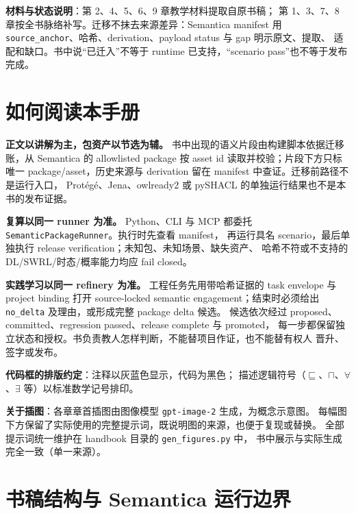 \documentclass[a4paper]{ctexbook}
\begin{document}
\begin{noteblock}
\textbf{材料与状态说明}：第 2、4、5、6、9 章教学材料提取自原书稿；
第 1、3、7、8 章按全书脉络补写。迁移不抹去来源差异：Semantica manifest 用
\texttt{source\_anchor}、哈希、derivation、payload status 与 gap 明示原文、提取、
适配和缺口。书中说“已迁入”不等于 runtime 已支持，“scenario pass”也不等于发布完成。
\end{noteblock}

\section*{如何阅读本手册}

\textbf{正文以讲解为主，包资产以节选为辅。}
书中出现的语义片段由构建脚本依据迁移账，从 Semantica 的 allowlisted package
按 asset id 读取并校验；片段下方只标唯一 package/asset，历史来源与 derivation
留在 manifest 中查证。迁移前路径不是运行入口，
Protégé、Jena、owlready2 或 pySHACL 的单独运行结果也不是本书的发布证据。

\textbf{复算以同一 runner 为准。}
Python、CLI 与 MCP 都委托 \texttt{SemanticPackageRunner}。执行时先查看 manifest，
再运行具名 scenario，最后单独执行 release verification；未知包、未知场景、缺失资产、
哈希不符或不支持的 DL/SWRL/时态/概率能力均应 fail closed。

\textbf{实践学习以同一 refinery 为准。}
工程任务先用带哈希证据的 task envelope 与 project binding 打开 source-locked semantic
engagement；结束时必须给出 \texttt{no\_delta} 及理由，或形成完整 package delta 候选。
候选依次经过 proposed、committed、regression passed、release complete 与 promoted，
每一步都保留独立状态和授权。书负责教人怎样判断，不能替项目作证，也不能替有权人
晋升、签字或发布。

\textbf{代码框的排版约定}：注释以\textcolor{cmtgray}{灰蓝色}显示，代码为黑色；
描述逻辑符号（\(\sqsubseteq\)、\(\sqcap\)、\(\forall\)、\(\exists\) 等）以标准数学记号排印。

\textbf{关于插图}：各章章首插图由图像模型 \texttt{gpt-image-2} 生成，为概念示意图。
每幅图下方保留了实际使用的完整提示词，既说明图的来源，也便于复现或替换。
全部提示词统一维护在 handbook 目录的 \texttt{gen\_figures.py} 中，
书中展示与实际生成完全一致（单一来源）。

\section*{书稿结构与 Semantica 运行边界}


\mainmatter
\end{document}

